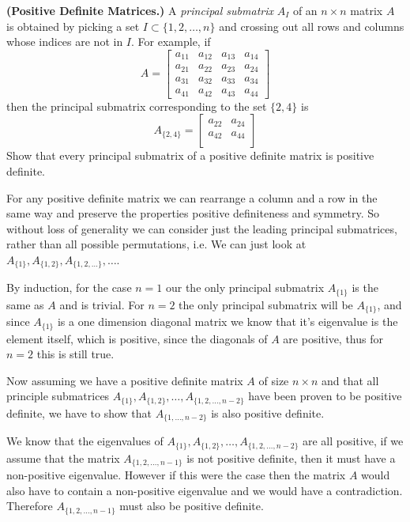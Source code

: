 \textbf{(Positive Definite Matrices.)}  A \textit{principal submatrix}
$A_I$ of  an $n \times n$ matrix $A$ is obtained by picking a set $I
\subset \{1,2,\dots,n\}$ and crossing out all rows and columns whose
indices are not in $I$. For example, if \[
A = \left[
  \begin{matrix}
    a_{11} & a_{12} & a_{13} & a_{14} \\
    a_{21} & a_{22} & a_{23} & a_{24}\\
    a_{31} & a_{32} & a_{33} & a_{34}\\
    a_{41} & a_{42} & a_{43} & a_{44}
\end{matrix}
\right]
\]
then the principal submatrix corresponding to the set $\{2,4\}$ is \[
A_{\{2,4\}} = \left[
  \begin{matrix}
  a_{22} & a_{24} \\
  a_{42} & a_{44} \\
  \end{matrix}
\right]
\]
Show that every principal submatrix of a positive definite matrix is
positive definite.

{\color{blue}

For any positive definite matrix we can rearrange a column and a row
in the same way and preserve the properties positive definiteness and
symmetry. So without loss of generality we can consider just the
leading principal submatrices, rather than all possible permutations,
i.e. We can just look at $A_{\{1\}}, A_{\{1,2\}}, A_{\{1,2,\dots\}}, \dots$.

By induction, for the case $n=1$ our the only principal submatrix
$A_{\{1\}}$ is the same as $A$ and is trivial. For $n=2$ the only
principal submatrix will be $A_{\{1\}}$, and since $A_{\{1\}}$ is a
one dimension diagonal matrix we know that it's eigenvalue is the
element itself, which is positive, since the diagonals of $A$ are
positive, thus for $n=2$ this is still true.

Now assuming we have a positive definite matrix $A$ of size $n \times n$
and that all principle submatrices $A_{\{1\}}, A_{\{1,2\}}, \dots, A_{\{1,2,\dots,n-2\}}$ have been
proven to be positive definite, we have to show that
$A_{\{1,\dots,n-2\}}$ is also positive definite.

We know that the eigenvalues of $A_{\{1\}}, A_{\{1,2\}}, \dots, A_{\{1,2,\dots,n-2\}}$
are all positive, if we assume that the matrix $A_{\{1,2,\dots,n-1\}}$
is not positive definite, then it must have a non-positive eigenvalue.
However if this were the case then the matrix $A$ would also have to
contain a non-positive eigenvalue and we would have a contradiction.
Therefore $A_{\{1,2,\dots,n-1\}}$ must also be positive definite.

}
